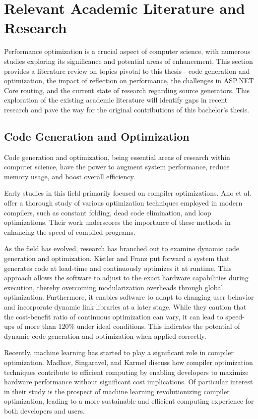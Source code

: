 \chapter{Relevant Academic Literature and Research}

Performance optimization is a crucial aspect of computer science, with numerous studies exploring its significance and potential areas of enhancement. This section provides a literature review on topics pivotal to this thesis - code generation and optimization, the impact of reflection on performance, the challenges in ASP.NET Core routing, and the current state of research regarding source generators. This exploration of the existing academic literature will identify gaps in recent research and pave the way for the original contributions of this bachelor's thesis.

\section{Code Generation and Optimization}

Code generation and optimization, being essential areas of research within computer science, have the power to augment system performance, reduce memory usage, and boost overall efficiency.

Early studies in this field primarily focused on compiler optimizations. Aho et al. \cite{Aho2007} offer a thorough study of various optimization techniques employed in modern compilers, such as constant folding, dead code elimination, and loop optimizations. Their work underscores the importance of these methods in enhancing the speed of compiled programs.

As the field has evolved, research has branched out to examine dynamic code generation and optimization. Kistler and Franz \cite{Kistler2003} put forward a system that generates code at load-time and continuously optimizes it at runtime. This approach allows the software to adjust to the exact hardware capabilities during execution, thereby overcoming modularization overheads through global optimization. Furthermore, it enables software to adapt to changing user behavior and incorporate dynamic link libraries at a later stage. While they caution that the cost-benefit ratio of continuous optimization can vary, it can lead to speed-ups of more than 120\% under ideal conditions. This indicates the potential of dynamic code generation and optimization when applied correctly.

Recently, machine learning has started to play a significant role in compiler optimization. Madhav, Singaravel, and Karmel \cite{Shreyas2021} discuss how compiler optimization techniques contribute to efficient computing by enabling developers to maximize hardware performance without significant cost implications. Of particular interest in their study is the prospect of machine learning revolutionizing compiler optimization, leading to a more sustainable and efficient computing experience for both developers and users.

